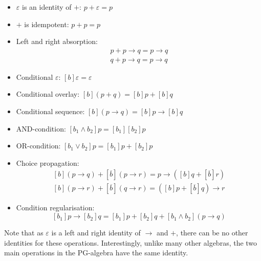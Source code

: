 \begin{itemize}
\item $\varepsilon$ is an identity of $+$: $p+\varepsilon=p$
\item $+$ is idempotent: $p+p=p$
\item Left and right absorption:\vspace{-0.3em}
\[
\begin{array}{c}
p+p\rightarrow q=p\rightarrow q\\
q+p\rightarrow q=p\rightarrow q
\end{array}
\]

\item Conditional $\varepsilon$: $[b]\varepsilon=\varepsilon$
\item Conditional overlay: $[b](p+q)=[b]p+[b]q$
\item Conditional sequence: $[b](p\rightarrow q)=[b]p\rightarrow[b]q$
\item AND-condition: $[b_{1}\wedge b_{2}]p=[b_{1}][b_{2}]p$
\item OR-condition: $[b_{1}\vee b_{2}]p=[b_{1}]p+[b_{2}]p$
\item Choice propagation:\vspace{-0.3em}
\[
\begin{array}{c}
[b](p\rightarrow q)+[\overline{b}](p\rightarrow r)=p\rightarrow([b]q+[\overline{b}]r)\\
{}[b](p\rightarrow r)+[\overline{b}](q\rightarrow r)=([b]p+[\overline{b}]q)\rightarrow r
\end{array}
\]

\item Condition regularisation:\vspace{-0.3em}
\[
[b_{1}]p\rightarrow[b_{2}]q=[b_{1}]p+[b_{2}]q+[b_{1}\wedge b_{2}](p\rightarrow q)
\]

\end{itemize}
Note that as $\varepsilon$ is a left and right identity of $\rightarrow$
and $+$, there can be no other identities for these operations. Interestingly,
unlike many other algebras, the two main operations in the PG-algebra
have the same identity.

